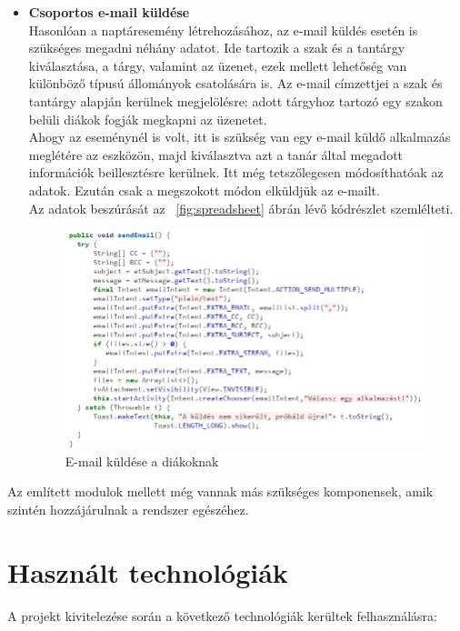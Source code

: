 \documentclass[12pt]{article}
\numberwithin{figure}{section}
\numberwithin{equation}{section}
\begin{document}
\begin{itemize}
\hfill \break


	\item \textbf{Csoportos e-mail küldése}\\
	Hasonlóan a naptáresemény létrehozásához, az e-mail küldés esetén is szükséges megadni néhány adatot. Ide tartozik a szak és a tantárgy kiválasztása, a tárgy, valamint az üzenet, ezek mellett lehetőség van különböző típusú állományok csatolására is. Az e-mail címzettjei a szak és tantárgy alapján kerülnek megjelölésre: adott tárgyhoz tartozó egy szakon belüli diákok fogják megkapni az üzenetet.\\
	Ahogy az eseménynél is volt, itt is szükség van egy e-mail küldő alkalmazás meglétére az eszközön, majd kiválasztva azt a tanár által megadott információk beillesztésre kerülnek. Itt még tetszőlegesen módosíthatóak az adatok. Ezután csak a megszokott módon elküldjük az e-mailt.\\
	Az adatok beszúrását az ~\ref{fig:spreadsheet} ábrán lévő kódrészlet szemlélteti.

	\begin{figure}[H]
		\centering
		\includegraphics[width=400px]{send_mail.jpg}
		\caption{E-mail küldése a diákoknak}
		\label{fig:send_mail}
	\end{figure}
	
\end{itemize}

\hfill \break
Az említett modulok mellett még vannak más szükséges komponensek, amik szintén hozzájárulnak a rendszer egészéhez.


\newpage

\section{Használt technológiák}
A projekt kivitelezése során a következő technológiák kerültek felhasználásra:
\end{document}
